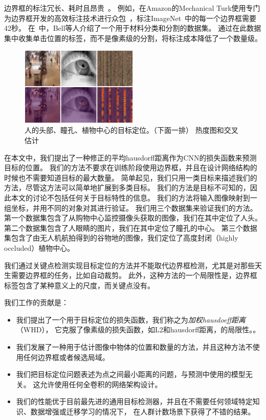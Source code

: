 \documentclass[10pt,twocolumn,letterpaper,UTF8]{article}
\begin{document}
边界框的标注冗长、耗时且昂贵~\cite{Papadopoulos2015}。
例如，在Amazon的Mechanical Turk使用专门为边界框开发的高效标注技术进行众包~\cite{su2012}，标注ImageNet~\cite{imagenet}中的每一个边界框需要42秒。
在~\cite{bell2015}中，Bell等人介绍了一个用于材料分类和分割的数据集。
通过在此数据集中收集单击位置的标签，而不是像素级的分割，将标注成本降低了一个数量级。



\begin{figure}[t]
\begin{center}
   \includegraphics[width=0.5\textwidth]{fig/results/collage2x3.png}
\end{center}
    \caption{人的头部、瞳孔、植物中心的目标定位。（下面一排）
          热度图和交叉估计}
\label{fig:collage}
\end{figure}


在本文中，我们提出了一种修正的平均hausdorff距离作为CNN的损失函数来预测目标的位置。
我们的方法不要求在训练阶段使用边界框，并且在设计网络结构的时候也不需要知道目标的最大数量。
简单起见，我们只用一类目标来描述我们的方法，尽管这方法可以简单地扩展到多类目标。
我们的方法是目标不可知的，因此本文的讨论不包括任何关于目标特性的信息。
我们的方法将输入图像映射到一组坐标，并用不同的对象对其进行验证。
我们用三个数据集来验证我们的方法。
第一个数据集包含了从购物中心监控摄像头获取的图像，我们在其中定位了人头。
第二个数据集包含了人眼睛的图片，我们在其中定位了瞳孔的中心。
第三个数据集包含了由无人机航拍得到的谷物地的图像，我们定位了高度封闭（highly occluded）植物中心。


我们通过关键点检测实现目标定位的方法并不能取代边界框检测，尤其是对那些天生需要边界框的任务，比如自动裁剪。
此外，这种方法的一个局限性是，边界框标签包含了某种意义上的尺度，而关键点没有。

我们工作的贡献是：
\begin{itemize}
    \item 我们提出了一个用于目标定位的损失函数，我们称之为\textit{加权hausdoeff距离}（WHD），
          它克服了像素级的损失函数，如L2和hausdorff距离，的局限性。。
    \item 我们发展了一种用于估计图像中物体的位置和数量的方法，并且这种方法不使用任何边界框或者候选局域。
    \item 我们把目标定位问题表述为点之间最小距离的问题，与预测中使用的模型无关。
          这允许使用任何全卷积的网络架构设计。
    \item 我们的性能优于目前最先进的通用目标检测器，并且在不需要任何领域特定知识、数据增强或迁移学习的情况下，
            在人群计数场景下获得了不错的结果。
\end{itemize}
\end{document}
